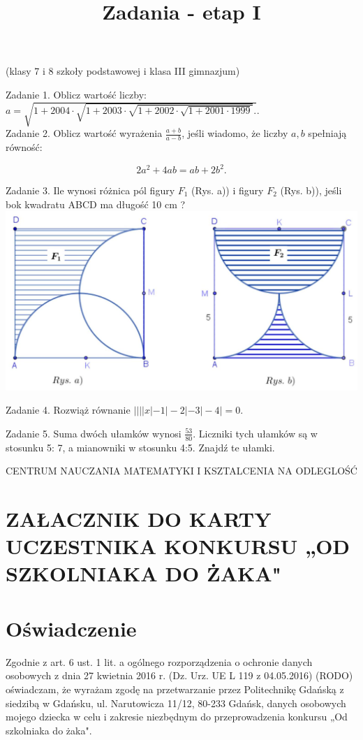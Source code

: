 \documentclass[10pt]{article}
\title{Zadania - etap I }
\author{}
\date{}
\begin{document}
\maketitle
(klasy 7 i 8 szkoły podstawowej i klasa III gimnazjum)

Zadanie 1. Oblicz wartość liczby: \(a=\sqrt{1+2004 \cdot \sqrt{1+2003 \cdot \sqrt{1+2002 \cdot \sqrt{1+2001 \cdot 1999}}} .}\).\\
Zadanie 2. Oblicz wartość wyrażenia \(\frac{a+b}{a-b}\), jeśli wiadomo, że liczby \(a, b\) spełniają równość:

\[
2 a^{2}+4 a b=a b+2 b^{2} .
\]

Zadanie 3. Ile wynosi różnica pól figury \(F_{1}\) (Rys. a)) i figury \(F_{2}\) (Rys. b)), jeśli bok kwadratu ABCD ma długość 10 cm ?\\
\includegraphics[max width=\textwidth, center]{2024_11_21_217d24491fe826e256c5g-1}

Zadanie 4. Rozwiąż równanie \(||||x|-1|-2|-3|-4 \mid=0\).

Zadanie 5. Suma dwóch ułamków wynosi \(\frac{53}{80}\). Liczniki tych ułamków są w stosunku 5: 7, a mianowniki w stosunku 4:5. Znajdź te ułamki.

CENTRUM NAUCZANIA MATEMATYKI I KSZTALCENIA NA ODLEGLOŚĆ

\section*{ZAŁACZNIK DO KARTY UCZESTNIKA KONKURSU „OD SZKOLNIAKA DO ŻAKA"}
\section*{Oświadczenie}
Zgodnie z art. 6 ust. 1 lit. a ogólnego rozporządzenia o ochronie danych osobowych z dnia 27 kwietnia 2016 r. (Dz. Urz. UE L 119 z 04.05.2016) (RODO) oświadczam, że wyrażam zgodę na przetwarzanie przez Politechnikę Gdańską z siedzibą w Gdańsku, ul. Narutowicza 11/12, 80-233 Gdańsk, danych osobowych mojego dziecka w celu i zakresie niezbędnym do przeprowadzenia konkursu „Od szkolniaka do żaka".
\end{document}
